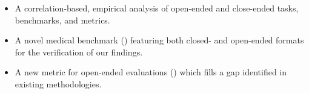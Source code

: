 \begin{itemize}
    \item A correlation-based, empirical analysis of open-ended and close-ended tasks, benchmarks, and metrics.
    \item A novel medical benchmark (\careqa{}) featuring both closed- and open-ended formats for the verification of our findings.
    \item A new metric for open-ended evaluations (\relaxed{}) which fills a gap identified in existing methodologies.
\end{itemize}








